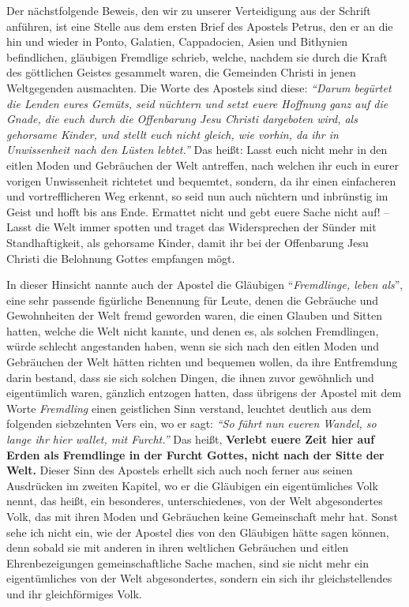 Der nächstfolgende Beweis, den wir zu unserer Verteidigung aus der Schrift
anführen, ist eine Stelle aus dem ersten Brief des Apostels Petrus, den er
an die hin und wieder in Ponto, Galatien, Cappadocien, Asien und
Bithynien befindlichen, gläubigen Fremdlige schrieb, welche, nachdem sie
durch die Kraft des göttlichen Geistes gesammelt waren, die Gemeinden Christi
in jenen Weltgegenden ausmachten. Die Worte des Apostels sind diese:
\textit{"`Darum
begürtet die Lenden eures Gemüts, seid nüchtern und setzt euere Hoffnung ganz
auf die Gnade, die euch durch die Offenbarung Jesu Christi dargeboten wird,
als gehorsame Kinder, und stellt euch nicht gleich, wie vorhin, da ihr in
Unwissenheit nach den Lüsten lebtet."'}
Das heißt:
Lasst euch nicht mehr in den eitlen Moden und Gebräuchen der Welt antreffen,
nach
welchen ihr euch in eurer vorigen Unwissenheit richtetet und bequemtet, sondern,
da ihr einen einfacheren und vortrefflicheren Weg erkennt, so seid nun auch
nüchtern und inbrünstig im Geist und hofft bis ans Ende. Ermattet nicht und
gebt euere Sache nicht auf! -- Lasst die Welt immer spotten und traget das
Widersprechen der Sünder mit Standhaftigkeit, als gehorsame Kinder, damit ihr
bei der Offenbarung Jesu Christi die Belohnung Gottes empfangen mögt.

\medskip


In dieser Hinsicht nannte auch der Apostel die Gläubigen "`\textit{Fremdlinge,
leben als}"', eine sehr
passende figürliche Benennung für Leute, denen die Gebräuche und Gewohnheiten
der Welt fremd geworden waren, die einen Glauben und Sitten hatten, welche die
Welt nicht kannte, und denen es, als solchen Fremdlingen, würde schlecht
angestanden haben, wenn sie sich nach den eitlen Moden und Gebräuchen der Welt
hätten richten und bequemen wollen, da ihre Entfremdung darin bestand, dass sie
sich solchen Dingen, die ihnen zuvor gewöhnlich und eigentümlich waren,
gänzlich entzogen hatten, dass übrigens der Apostel mit dem Worte
\textit{Fremdling}
einen geistlichen Sinn verstand, leuchtet deutlich aus dem folgenden siebzehnten
Vers ein, wo er sagt:
\textit{"`So führt nun eueren Wandel, so lange ihr hier wallet,
mit Furcht."'}
Das heißt, \textbf{Verlebt euere Zeit hier auf Erden als Fremdlinge in der
Furcht Gottes, nicht nach der Sitte der Welt.} Dieser Sinn des Apostels erhellt
sich
auch noch ferner aus seinen Ausdrücken im zweiten Kapitel, wo er die Gläubigen
ein eigentümliches Volk nennt, das heißt, ein besonderes, unterschiedenes, von
der
Welt abgesondertes Volk, das mit ihren Moden und Gebräuchen keine Gemeinschaft
mehr hat. Sonst sehe ich nicht ein, wie der Apostel dies von den Gläubigen
hätte sagen können, denn sobald sie mit anderen in ihren weltlichen Gebräuchen
und eitlen Ehrenbezeigungen gemeinschaftliche Sache machen, sind sie nicht mehr
ein eigentümliches von der Welt abgesondertes, sondern ein sich ihr
gleichstellendes und ihr gleichförmiges Volk.

